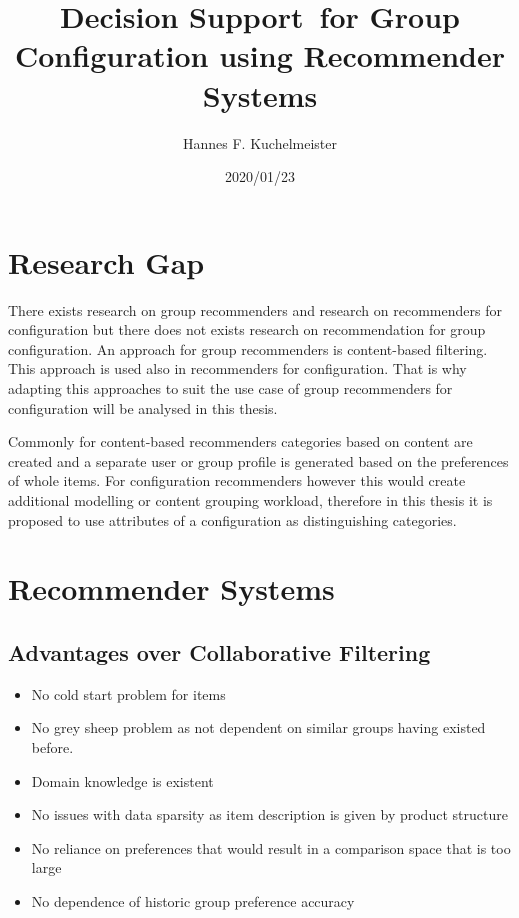 \documentclass{article}
\begin{document}
\title{Decision Support for Group Configuration using Recommender Systems}
\author{Hannes F. Kuchelmeister}
\date{2020/01/23}

\maketitle

\section{Research Gap}

There exists research on group recommenders and research on recommenders for configuration but there does not exists research on recommendation for group configuration. An approach for group recommenders is content-based filtering. This approach is used also in recommenders for configuration. That is why adapting this approaches to suit the use case of group recommenders for configuration will be analysed in this thesis.

Commonly for content-based recommenders categories based on content are created and a separate user or group profile is generated based on the preferences of whole items. For configuration recommenders however this would create additional modelling or content grouping workload, therefore in this thesis it is proposed to use attributes of a configuration as distinguishing categories.

\section{Recommender Systems}

\subsection{Advantages over Collaborative Filtering}
\begin{itemize}
    \item No cold start problem for items
    \item No grey sheep problem as not dependent on similar groups having existed before.
    \item Domain knowledge is existent
    \item No issues with data sparsity as item description is given by product structure
    \item No reliance on preferences that would result in a comparison space that is too large
    \item No dependence of historic group preference accuracy 
\end{itemize}
\end{document}

